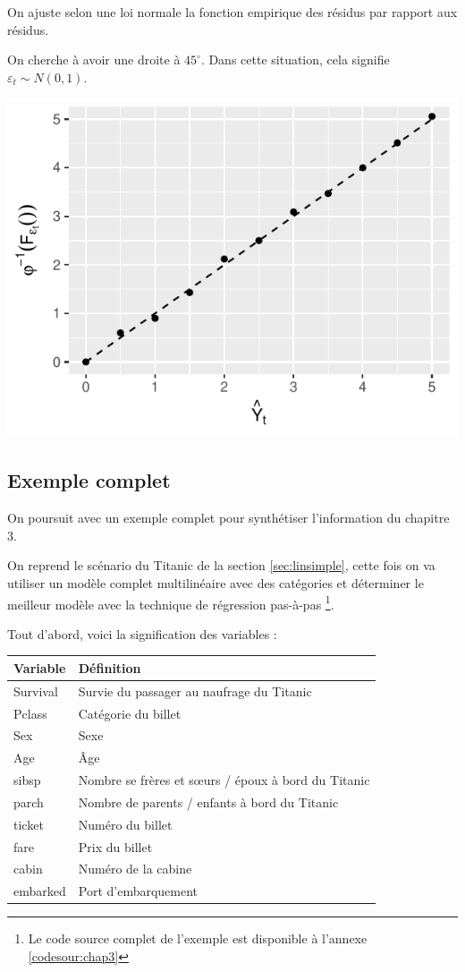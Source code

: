 \documentclass[11pt,french]{report}
\begin{document}
On ajuste selon une loi normale la fonction empirique des résidus par rapport aux résidus. \newline

On cherche à avoir une droite à $45^\circ$. Dans cette situation, cela signifie $\varepsilon_t \sim N(0,1)$.

\includegraphics{notes_de_cours-035}

\subsection{Exemple complet}
\label{ex:chapitre3}

On poursuit avec un exemple complet pour synthétiser l'information du chapitre 3. \newline

On reprend le scénario du Titanic de la section \ref{sec:linsimple}, cette fois on va utiliser un modèle complet multilinéaire avec des catégories et déterminer le meilleur modèle avec la technique de régression pas-à-pas \footnote{Le code source complet de l'exemple est disponible à l'annexe \ref{codesour:chap3}}.  \newline

Tout d'abord, voici la signification des variables :
\begin{center}
\begin{tabularx}{\textwidth}{XX}
\hline
Variable & Définition \\
\hline
Survival & Survie du passager au naufrage du Titanic \\
Pclass & Catégorie du billet \\
Sex & Sexe \\
Age & Âge \\
sibsp & Nombre se frères et sœurs / époux à bord du Titanic \\
parch & Nombre de parents / enfants à bord du Titanic \\
ticket & Numéro du billet \\
fare & Prix du billet \\
cabin & Numéro de la cabine \\
embarked & Port d'embarquement \\
\hline
\end{tabularx}
\end{center}
\end{document}
